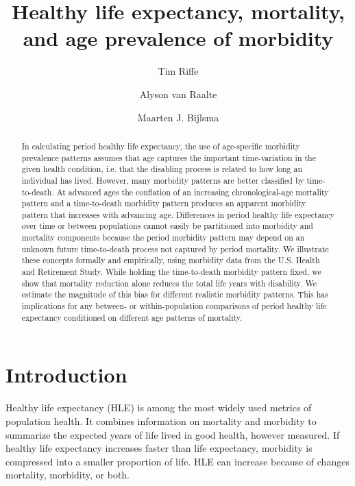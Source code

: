 \documentclass[11pt,oneside,a4paper]{article} %
\begin{document}
\title{Healthy life expectancy, mortality, and age prevalence of morbidity}

\author[1]{Tim Riffe}
\author[1]{Alyson van Raalte}
\author[1]{Maarten J. Bijlsma}


\maketitle

\begin{abstract}
In calculating period healthy life expectancy, the use of age-specific morbidity prevalence patterns assumes that age captures the important time-variation in the given health condition, i.e. that the disabling process is related to how long an individual has lived. However, many morbidity patterns are better classified by time-to-death. At advanced ages the conflation of an increasing chronological-age mortality pattern and a time-to-death morbidity pattern produces an apparent morbidity pattern that increases with advancing age. Differences in period healthy life expectancy over time or between populations cannot easily be partitioned into morbidity and mortality components because
the period morbidity pattern may depend on an unknown future time-to-death process not captured by period mortality. We illustrate these concepts formally and empirically, using morbidity data from the U.S. Health and Retirement Study. While holding the time-to-death morbidity pattern fixed, we show that mortality reduction alone reduces the total life years with disability. We estimate the magnitude of this bias for different realistic morbidity patterns. This has implications for any between- or within-population comparisons of period healthy life expectancy conditioned on different age patterns of mortality.
\end{abstract}

\section{Introduction}

Healthy life expectancy (HLE) is among the most widely used metrics of
population health. It combines information on mortality and morbidity to summarize the expected years of life lived in good health, however measured. If healthy life expectancy increases faster than life expectancy, morbidity is compressed into a smaller proportion of life. HLE can increase because of changes mortality, morbidity, or both.
\end{document}
